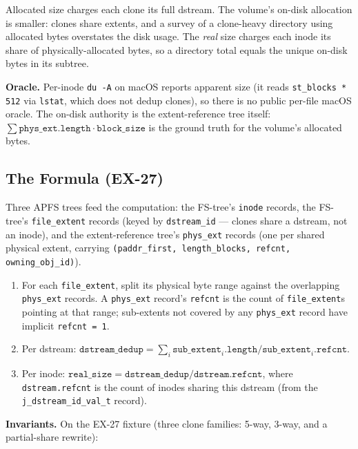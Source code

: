 Allocated size charges each clone its full dstream. The volume's
on-disk allocation is smaller: clones share extents, and a survey of
a clone-heavy directory using allocated bytes overstates the disk
usage. The \emph{real} size charges each inode its share of
physically-allocated bytes, so a directory total equals the unique
on-disk bytes in its subtree.

\textbf{Oracle.} Per-inode \texttt{du -A} on macOS reports
apparent size (it reads \texttt{st\_blocks * 512} via
\texttt{lstat}, which does not dedup clones), so there is no
public per-file macOS oracle. The on-disk authority is the
extent-reference tree itself:
$\sum \texttt{phys\_ext.length} \cdot \texttt{block\_size}$ is the
ground truth for the volume's allocated bytes.

\subsection{The Formula (EX-27)}

Three APFS trees feed the computation: the FS-tree's \texttt{inode}
records, the FS-tree's \texttt{file\_extent} records (keyed by
\texttt{dstream\_id} --- clones share a dstream, not an inode), and
the extent-reference tree's \texttt{phys\_ext} records (one per
shared physical extent, carrying \texttt{(paddr\_first,
length\_blocks, refcnt, owning\_obj\_id)}).

\begin{enumerate}
  \item For each \texttt{file\_extent}, split its physical byte
    range against the overlapping \texttt{phys\_ext} records. A
    \texttt{phys\_ext} record's \texttt{refcnt} is the count of
    \texttt{file\_extent}s pointing at that range; sub-extents
    not covered by any \texttt{phys\_ext} record have implicit
    \texttt{refcnt = 1}.
  \item Per dstream:
    $\texttt{dstream\_dedup} = \sum_i
    \texttt{sub\_extent}_i\texttt{.length} /
    \texttt{sub\_extent}_i\texttt{.refcnt}$.
  \item Per inode:
    $\texttt{real\_size} = \texttt{dstream\_dedup} /
    \texttt{dstream.refcnt}$,
    where \texttt{dstream.refcnt} is the count of inodes sharing
    this dstream (from the \texttt{j\_dstream\_id\_val\_t} record).
\end{enumerate}

\textbf{Invariants.} On the EX-27 fixture (three clone families:
5-way, 3-way, and a partial-share rewrite):


